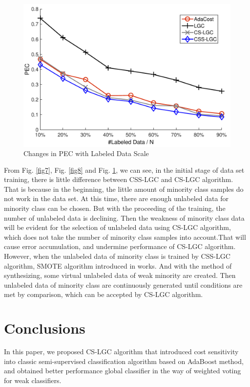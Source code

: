 \documentclass{svjour3}                     %
\begin{document}
\begin{figure}[h]
\includegraphics[width=\textwidth]{plot/fig9.pdf}
\caption{Changes in PEC with Labeled Data Scale} \label{fig9}
\end{figure}

From Fig. \ref{fig7}, Fig. \ref{fig8} and Fig. \ref{fig9}, we can see, in the initial stage of data set training, there is little difference between CSS-LGC and CS-LGC algorithm. That is because in the beginning, the little amount of minority class samples do not work in the data set. At this time, there are enough unlabeled data for minority class can be chosen. But with the proceeding of the training, the number of unlabeled data is declining. Then the weakness of minority class data will be evident for the selection of unlabeled data using CS-LGC algorithm, which does not take the number of minority class samples into account.That will cause error accumulation, and undermine performance of
CS-LGC algorithm. However, when the unlabeled data of minority class is trained by CSS-LGC algorithm, SMOTE algorithm introduced in works. And with the method of synthesizing, some virtual unlabeled data of weak minority are created. Then unlabeled data of minority class are continuously generated until conditions are met by comparison, which can be accepted by CS-LGC algorithm.


\section{Conclusions}

In this paper, we proposed CS-LGC algorithm that introduced cost sensitivity into classic semi-supervised classification algorithm based on AdaBoost method, and obtained better performance
global classifier in the way of weighted voting for weak classifiers.
\end{document}
